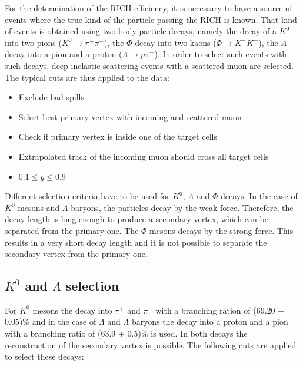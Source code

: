 For the determination of the RICH efficiency, it is necessary to have a source of events where the true kind of the particle passing the RICH is known. That kind of events is obtained using two body particle decays, namely the decay of a $K^0$ into two pions ($K^0 \rightarrow \pi^+\pi^-$), the $\Phi$ decay into two kaons ($\Phi \rightarrow K^+K^-$), the $\Lambda$ decay into a pion and a proton ($\Lambda \rightarrow p\pi^-$). In order to select such events with such decays, deep inelastic scattering events with a scattered muon are selected. The typical cuts are thus applied to the data:
\begin{itemize}
  \item Exclude bad spills
  \item Select best primary vertex with incoming and scattered muon
  \item Check if primary vertex is inside one of the target cells
  \item Extrapolated track of the incoming muon should cross all target cells
  \item $0.1 \le y \le 0.9$
\end{itemize}

Different selection criteria have to be used for $K^0$, $\Lambda$ and $\Phi$ decays. In the case of $K^0$ mesons and $\Lambda$ baryons, the particles decay by the weak force. Therefore, the decay length is long enough to produce a secondary vertex, which can be separated from the primary one. The $\Phi$ mesons decays by the strong force. This results in a very short decay length and it is not possible to separate the secondary vertex from the primary one.

\subsection{$K^0$ and $\Lambda$ selection}

For $K^0$ mesons the decay into $\pi^+$ and $\pi^-$ with a branching ration of (69.20 $\pm$ 0.05)\% \cite{} and in the case of $\Lambda$ and $\bar{\Lambda}$ baryons the decay into a proton and a pion with a branching ratio of (63.9 $\pm$ 0.5)\% \cite{} is used. In both decays the reconstruction of the secondary vertex is possible. The following cuts are applied to select these decays:

